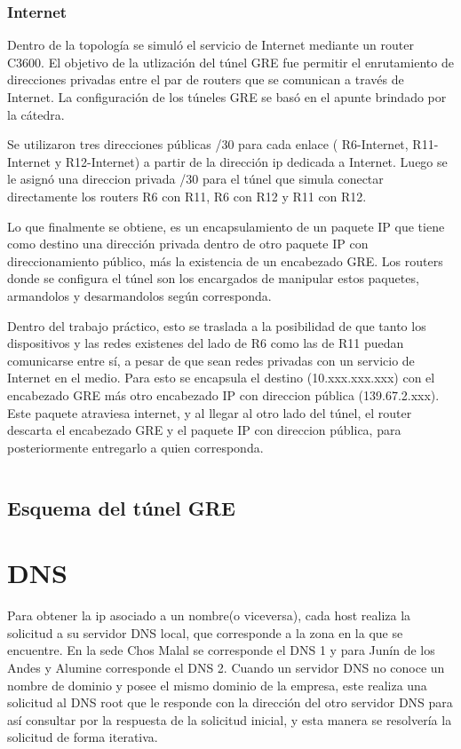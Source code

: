 \documentclass[12pt, a4paper, spanish]{article}
\begin{document}
\subsubsection{Internet}

Dentro de la topología se simuló el servicio de Internet mediante un 
router C3600.
El objetivo de la utlización del túnel GRE fue permitir el enrutamiento de 
direcciones privadas entre el par de routers que se comunican a través de 
Internet.
La configuración de los túneles GRE se basó en el apunte brindado por la 
cátedra. 

Se utilizaron tres direcciones públicas /30 para cada enlace ( R6-Internet, 
R11-Internet y R12-Internet) a partir de la dirección ip dedicada a Internet.
Luego se le asignó una direccion privada /30 para el túnel que simula 
conectar directamente los routers R6 con R11, R6 con R12 y R11 con R12. 

Lo que finalmente se obtiene, es un encapsulamiento de un paquete IP que 
tiene como destino una dirección privada dentro de otro paquete IP con 
direccionamiento público, más la existencia de un encabezado GRE.
Los routers donde se configura el túnel son los encargados de manipular estos 
paquetes, armandolos y desarmandolos según corresponda.

Dentro del trabajo práctico, esto se traslada a la posibilidad de que tanto 
los dispositivos y las redes existenes del lado de R6 como las de R11 puedan 
comunicarse entre sí, a pesar de que sean redes privadas con un servicio de 
Internet en el medio.
Para esto se encapsula el destino (10.xxx.xxx.xxx) con el encabezado GRE más 
otro encabezado IP con direccion pública (139.67.2.xxx).
Este paquete atraviesa internet, y al llegar al otro lado del túnel, 
el router descarta el encabezado GRE y el paquete IP con direccion pública, 
para posteriormente entregarlo a quien corresponda.

{\small
\begin{verbatim}

\end{verbatim}
}

\subsection{Esquema del túnel GRE}

\newpage


\newpage
\section{DNS}
Para obtener la ip asociado a un nombre(o viceversa), cada host realiza 
la solicitud a su servidor DNS local, que corresponde a la zona en la que 
se encuentre.
En la sede Chos Malal se corresponde el DNS 1 y para Junín de los Andes y 
Alumine corresponde el DNS 2.
Cuando un servidor DNS no conoce un nombre de dominio y posee el mismo 
dominio de la empresa, este realiza una solicitud al DNS root que le responde 
con la dirección del otro servidor DNS para así consultar por la respuesta de 
la solicitud inicial, y esta manera se resolvería la solicitud de forma 
iterativa.
\end{document}
